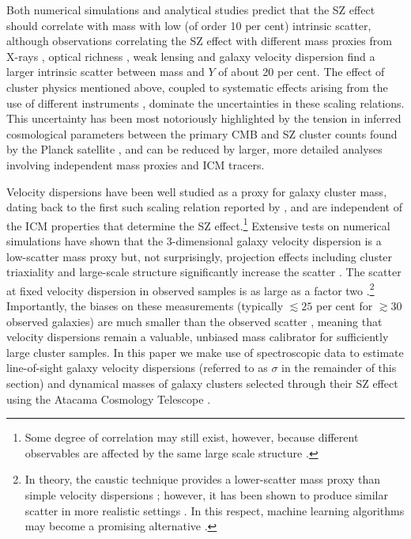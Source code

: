 Both numerical simulations \citep{springel01_sz,dasilva04,motl05,nagai06,battaglia12} and analytical studies \citep{reid06,afshordi08,shaw08} predict that the SZ effect should correlate with mass with low (of order 10 per cent) intrinsic scatter, although observations correlating the SZ effect with different mass proxies from X-rays \citep{bonamente08,andersson11,planck11xi,benson13,rozo14_scalings}, optical richness \citep{high10,planck11xii,menanteau13,sehgal13}, weak lensing \citep{hoekstra12,marrone12,planckintiii,gruen14} and galaxy velocity dispersion \citep{sifon13,ruel14,rines16} find a larger intrinsic scatter between mass and $Y$ of about 20 per cent. The effect of cluster physics mentioned above, coupled to systematic effects arising from the use of different instruments \citep{mahdavi13,rozo14_observables}, dominate the uncertainties in these scaling relations. This uncertainty has been most notoriously highlighted by the tension in inferred cosmological parameters between the primary CMB and SZ cluster counts found by the Planck satellite \citep{planck15xxiv}, and can be reduced by larger, more detailed analyses involving independent mass proxies and ICM tracers.

Velocity dispersions have been well studied as a proxy for galaxy cluster mass, dating back to the first such scaling relation reported by \cite{evrard89}, and are independent of the ICM properties that determine the SZ effect.\footnote{Some degree of correlation may still exist, however, because different observables are affected by the same large scale structure \citep{white10}.} Extensive tests on numerical simulations have shown that the 3-dimensional galaxy velocity dispersion is a low-scatter mass proxy but, not surprisingly, projection effects including cluster triaxiality and large-scale structure significantly increase the scatter \citep{white10,saro13}. The scatter at fixed velocity dispersion in observed samples is as large as a factor two \citep{old14,old15}.\footnote{In theory, the caustic technique provides a lower-scatter mass proxy than simple velocity dispersions \citep{gifford13}; however, it has been shown to produce similar scatter in more realistic settings \citep{old14,old15}. In this respect, machine learning algorithms may become a promising alternative \citep{ntampaka15,ntampaka16}.} Importantly, the biases on these measurements (typically $\lesssim25$ per cent for $\gtrsim30$ observed galaxies) are much smaller than the observed scatter \citep{old15}, meaning that velocity dispersions remain a valuable, unbiased mass calibrator for sufficiently large cluster samples. In this paper we make use of spectroscopic data to estimate line-of-sight galaxy velocity dispersions (referred to as $\sigma$ in the remainder of this section) and dynamical masses of galaxy clusters selected through their SZ effect using the Atacama Cosmology Telescope \citep[ACT,][]{marriage11_sz,hasselfield13}.

